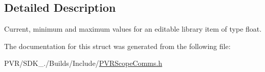 \subsection{Detailed Description}
Current, minimum and maximum values for an editable library item of type float. 



 

The documentation for this struct was generated from the following file\+:\begin{DoxyCompactItemize}
\item 
P\+V\+R/\+S\+D\+K\+\_./\+Builds/\+Include/\hyperlink{_p_v_r_scope_comms_8h}{P\+V\+R\+Scope\+Comms.\+h}\end{DoxyCompactItemize}
